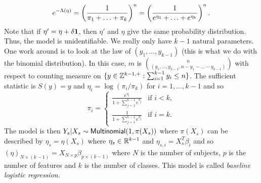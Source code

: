 \begin{examples}
\begin{itemize}
        \[e^{-\Lambda(\eta)} = \left(\frac{1}{\pi_1+\ldots+\pi_k}\right)^n = \left(\frac{1}{e^{\eta_1}+\ldots+e^{\eta_k}}\right)^n. \]
        Note that if $\eta' = \eta + \delta {{\bf 1}}$, then $\eta'$ and $\eta$ give the same probability distribution. Thus, the model is unidentifiable. We really only have $k-1$ natural parameters. One work around is to look at the law of $(y_1,\ldots, y_{k-1})$ (this is what we do with the binomial distribution). In this case, $m$ is $\binom{n}{(y_1,\ldots,y_{k-1},n-y_{1}-\ldots-y_{k-1})}$ with respect to counting measure on $\{y \in {{\mathbb Z}}^{k-1,+}: \sum_{i=1}^{k-1} y_i \le n \}$. The sufficient statistic is $S(y)=y$ and $\eta_i = \log(\pi_i/\pi_k)$ for $i=1,\ldots,k-1$ and so 
        \[\pi_i = \begin{cases}
            \frac{e^{\eta_i}}{1+\sum_{j=1}^{k-1}e^{\eta_j}}& \text{if } i < k,\\
            \frac{1}{1+\sum_{j=1}^{k-1}e^{\eta_j}} & \text{if } i=k.
        \end{cases} \]
        The model is then $Y_s |X_s \sim \mathsf{Multinomial}(1,\pi(X_s))$ where $\pi(X_s)$ can be described by $\eta_s = \eta(X_s)$ where $\eta_s \in {\mathbb R}^{k-1}$ and $\eta_{s,i}= X_s^T\beta_i$ and so $(\eta)_{N \times (k-1)} = X_{N \times p}\beta_{p \times (k-1)}$ where $N$ is the number of subjects, $p$ is the number of features and $k$ is the number of classes. This model is called \emph{baseline logistic regression}. 
    \end{itemize}
\end{examples}
